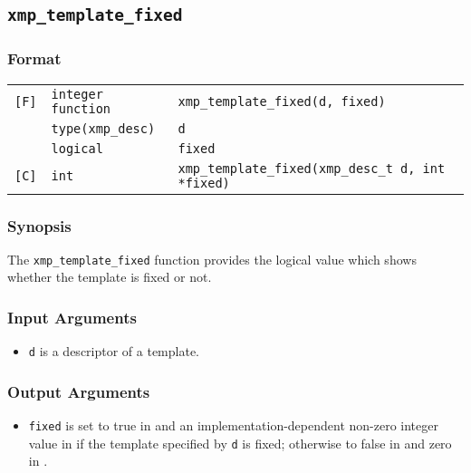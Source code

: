 \subsection{\tt xmp\_template\_fixed}

\subsubsection*{Format}

\begin{tabular}{lll}

\verb![F]!& {\tt integer function}& {\tt xmp\_template\_fixed(d, fixed)}\\
          & {\tt type(xmp\_desc)} & {\tt d}\\
          & {\tt logical} & {\tt fixed}\\

\verb![C]!&  {\tt int}& {\tt xmp\_template\_fixed(xmp\_desc\_t d, int *fixed)}\\

\end{tabular}

\subsubsection*{Synopsis}

The {\tt xmp\_template\_fixed} function provides the logical value which
shows whether the template is fixed or not.


\subsubsection*{Input Arguments}
\begin{itemize}
 \item {\tt d} is a descriptor of a template.
\end{itemize}

\subsubsection*{Output Arguments}
\begin{itemize}
 \item {\tt fixed} is set to true in {\XMPF} and an
       implementation-dependent non-zero integer value in {\XMPC} if the
       template specified by {\tt d} is fixed; otherwise to false in
       {\XMPF} and zero in {\XMPC}.
\end{itemize}

